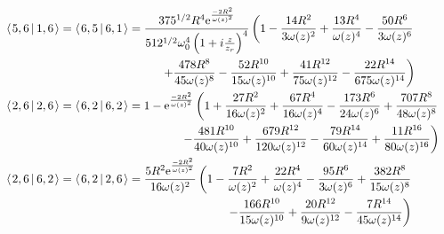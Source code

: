 \documentclass[11pt]{amsart}
\makeatletter
\newcommand{\e}{{\rm e}}				%
\newcommand{\msp}[1]{\mspace{#1mu}}		%
\newcommand{\0}{\varnothing}		%
\newcommand{\brac}[2]{\left\langle\msp{2} #1\left\lvert \msp{3.5} #2 \right.\right\rangle}	%
\newcommand{\1}{!}
\newcommand{\2}{@}
\newcommand{\3}{\#}
\newcommand{\4}{\$}
\newcommand{\5}{\%}
\newcommand{\6}{$^\wedge$}
\newcommand{\7}{\&}
\newcommand{\8}{*}
\newcommand{\9}{(}
\makeatother
\begin{document}
\begin{align*}
\\
&
\brac{5,6}{1,6} = \brac{6,5}{6,1}=\frac{375^{1/2}R^4\e^{\frac{-2R^2}{\omega(z)^2}}}{512^{1/2}\omega_0^4\left(1+i\frac{z}{z_r}\right)^4}\left(1-\frac{14R^2}{3\omega(z)^2}+\frac{13R^4}{\omega(z)^4}-\frac{50R^6}{3\omega(z)^6}
\right.
\\
&
\msp{240}\left.+\frac{478R^8}{45\omega(z)^8}-\frac{52R^{10}}{15\omega(z)^{10}}+\frac{41R^{12}}{75\omega(z)^{12}}-\frac{22R^{14}}{675\omega(z)^{14}}\right)
\\
&
\brac{2,6}{2,6} = \brac{6,2}{6,2} = 1-\e^{\frac{-2R^2}{\omega(z)^2}}\left(1+\frac{27R^2}{16\omega(z)^2}+\frac{67R^4}{16\omega(z)^4}-\frac{173R^6}{24\omega(z)^6}+\frac{707R^8}{48\omega(z)^8}
\right.
\\
&
\left.
\msp{270}-\frac{481R^{10}}{40\omega(z)^{10}}+\frac{679R^{12}}{120\omega(z)^{12}}-\frac{79R^{14}}{60\omega(z)^{14}}+\frac{11R^{16}}{80\omega(z)^{16}}\right)
\\
&
\brac{2,6}{6,2} =\brac{6,2}{2,6} = \frac{5R^2\e^{\frac{-2R^2}{\omega(z)^2}}}{16\omega(z)^2}\left(1-\frac{7R^2}{\omega(z)^2}+\frac{22R^4}{\omega(z)^4}-\frac{95R^6}{3\omega(z)^6}+\frac{382R^8}{15\omega(z)^8}\right.
\\
&
\msp{340}\left.-\frac{166R^{10}}{15\omega(z)^{10}}+\frac{20R^{12}}{9\omega(z)^{12}}-\frac{7R^{14}}{45\omega(z)^{14}}\right)
\end{align*}
\end{document}
